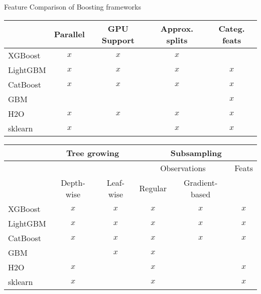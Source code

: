 \begin{vbframe}{Feature Comparison of Boosting frameworks}

  \begin{scriptsize}

\begin{tabular}{lcccc}
  \toprule
   & Parallel & GPU Support & Approx. splits & Categ. feats\\
  \midrule
  XGBoost  & $x$ & $x$ & $x$ &     \\
  LightGBM & $x$ & $x$ & $x$ & $x$ \\
  CatBoost & $x$ & $x$ & $x$ & $x$ \\
  GBM      &     &     &     & $x$ \\
  H2O      & $x$ & $x$ & $x$ & $x$ \\
  sklearn  & $x$ &     & $x$ & $x$ \\
  \bottomrule
\end{tabular}

\lz

\begin{tabular}{lccccc}
  \toprule
   & \multicolumn{2}{c}{Tree growing} & \multicolumn{3}{c}{Subsampling} \\
  \midrule
            &        &               & \multicolumn{2}{c}{Observations} & Feats \\
            & Depth-wise & Leaf-wise & Regular & Gradient-based & \\
  \midrule
  XGBoost   & $x$ & $x$ & $x$ & $x$ & $x$ \\
  LightGBM  & $x$ & $x$ & $x$ & $x$ & $x$ \\
  CatBoost  & $x$ & $x$ & $x$ & $x$ & $x$ \\
  GBM       &     & $x$ & $x$ &     &     \\
  H2O       & $x$ &     & $x$ &     & $x$ \\
  sklearn   & $x$ &     & $x$ &     & $x$ \\
  \bottomrule
\end{tabular}

\end{scriptsize}

\end{vbframe}
\endlecture

